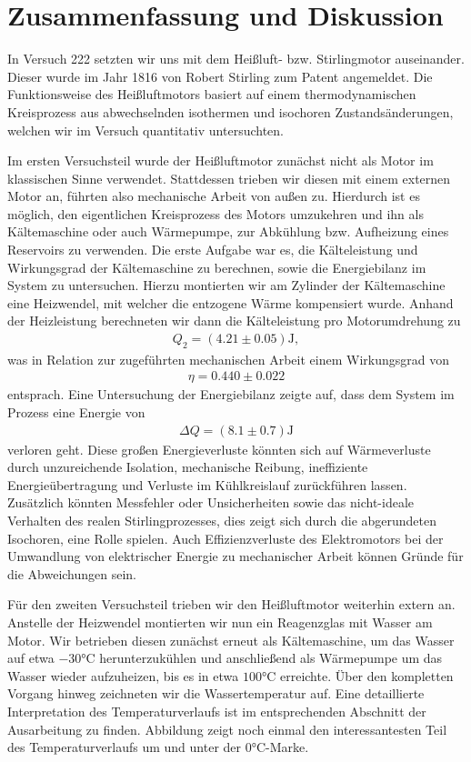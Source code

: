 \section{Zusammenfassung und Diskussion}

In Versuch 222 setzten wir uns mit dem Heißluft- bzw. Stirlingmotor auseinander. Dieser wurde im Jahr 1816 von Robert Stirling zum Patent angemeldet. Die Funktionsweise des Heißluftmotors basiert auf einem thermodynamischen Kreisprozess aus abwechselnden isothermen und isochoren Zustandsänderungen, welchen wir im Versuch quantitativ untersuchten.

Im ersten Versuchsteil wurde der Heißluftmotor zunächst nicht als Motor im klassischen Sinne verwendet. Stattdessen trieben wir diesen mit einem externen Motor an, führten also mechanische Arbeit von außen zu. Hierdurch ist es möglich, den eigentlichen Kreisprozess des Motors umzukehren und ihn als Kältemaschine oder auch Wärmepumpe, zur Abkühlung bzw. Aufheizung eines Reservoirs zu verwenden. Die erste Aufgabe war es, die Kälteleistung und Wirkungsgrad der Kältemaschine zu berechnen, sowie die Energiebilanz im System zu untersuchen. Hierzu montierten wir am Zylinder der Kältemaschine eine Heizwendel, mit welcher die entzogene Wärme kompensiert wurde. Anhand der Heizleistung berechneten wir dann die Kälteleistung pro Motorumdrehung zu
\begin{align*}
  Q_2 = (4.21 \pm 0.05)\si{\joule},
\end{align*}
was in Relation zur zugeführten mechanischen Arbeit einem Wirkungsgrad von
\begin{align*}
  \eta = 0.440 \pm 0.022
\end{align*}
entsprach. Eine Untersuchung der Energiebilanz zeigte auf, dass dem System im Prozess eine Energie von
\begin{align*}
  \Delta Q = (8.1 \pm 0.7)\si{\joule}
\end{align*}
verloren geht. Diese großen Energieverluste könnten sich auf Wärmeverluste durch unzureichende Isolation, mechanische Reibung, ineffiziente Energieübertragung und Verluste im Kühlkreislauf zurückführen lassen. Zusätzlich könnten Messfehler oder Unsicherheiten sowie das nicht-ideale Verhalten des realen Stirlingprozesses, dies zeigt sich durch die abgerundeten Isochoren, eine Rolle spielen. Auch Effizienzverluste des Elektromotors bei der Umwandlung von elektrischer Energie zu mechanischer Arbeit können Gründe für die Abweichungen sein.

Für den zweiten Versuchsteil trieben wir den Heißluftmotor weiterhin extern an. Anstelle der Heizwendel montierten wir nun ein Reagenzglas mit Wasser am Motor. Wir betrieben diesen zunächst erneut als Kältemaschine, um das Wasser auf etwa $-30\si{\celsius}$ herunterzukühlen und anschließend als Wärmepumpe um das Wasser wieder aufzuheizen, bis es in etwa $100\si{\celsius}$ erreichte. Über den kompletten Vorgang hinweg zeichneten wir die Wassertemperatur auf. Eine detaillierte Interpretation des Temperaturverlaufs ist im entsprechenden Abschnitt der Ausarbeitung zu finden. Abbildung  zeigt noch einmal den interessantesten Teil des Temperaturverlaufs um und unter der $0\si{\celsius}$-Marke.

